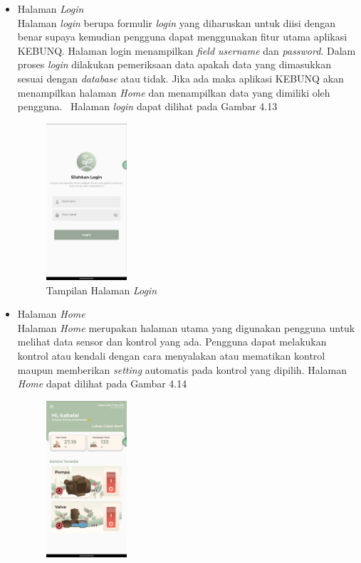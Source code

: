 \begin{flushleft}
\begin{justify}
\begin{enumerate}
\begin{itemize}
                \item Halaman \emph{Login}\\
                Halaman \emph{login} berupa formulir \emph{login} yang diharuskan untuk diisi dengan benar supaya kemudian pengguna dapat menggunakan fitur utama aplikasi KEBUNQ. Halaman login menampilkan \emph{field username} dan \emph{password}.
                Dalam proses \emph{login} dilakukan pemeriksaan data apakah data yang dimasukkan sesuai dengan \emph{database} atau tidak. Jika ada maka aplikasi KEBUNQ akan menampilkan halaman \emph{Home} dan menampilkan data yang dimiliki oleh pengguna. \
                Halaman \emph{login} dapat dilihat pada Gambar 4.13
                \begin{figure}[ht]
                    \centering
                    \includegraphics[width=3cm]{images/bab 4/login.jpeg}
                    \caption{Tampilan Halaman \emph{Login}}
                \end{figure}
                \vspace{10cm}
                \item Halaman \emph{Home}\\
                Halaman \emph{Home} merupakan halaman utama yang digunakan pengguna untuk melihat data sensor dan kontrol yang ada. Pengguna dapat melakukan kontrol atau kendali dengan cara menyalakan atau mematikan kontrol maupun memberikan \emph{setting} automatis pada kontrol yang dipilih.
                Halaman \emph{Home} dapat dilihat pada Gambar 4.14
                \begin{figure}[ht]
                    \centering
                    \includegraphics[width=3cm]{images/bab 4/home.jpeg}

\end{figure}
\end{itemize}
\end{enumerate}
\end{justify}
\end{flushleft}
